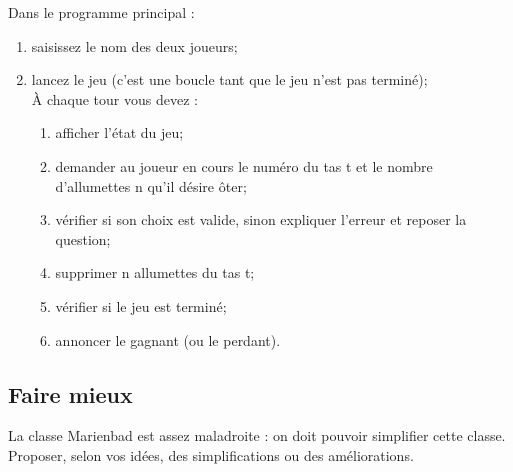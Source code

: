 \documentclass[a4paper,12pt,french]{book}
\begin{document}
Dans le programme principal :
\begin{enumerate}[--]
	\item 	saisissez le nom des deux joueurs;

\item lancez le jeu (c’est une boucle tant que le jeu n’est pas terminé);\\
 	À chaque tour vous devez :
\begin{enumerate}[--]
	\item 	afficher l'état du jeu;
	\item 	demander au joueur en cours le numéro du tas t et le nombre d’allumettes
	n qu’il désire ôter;
	\item vérifier si son choix est valide, sinon expliquer l’erreur et reposer la
	question;
	\item supprimer n allumettes du tas t;
	\item vérifier si le jeu est terminé;
	 \item annoncer le gagnant (ou le perdant).
\end{enumerate}
\end{enumerate}
\subsection*{Faire mieux}
La classe Marienbad est assez maladroite : on doit pouvoir simplifier cette classe. Proposer, selon vos idées, des simplifications ou des améliorations.
\end{document}

